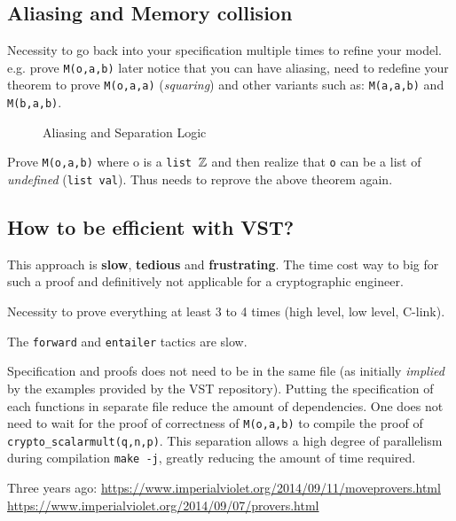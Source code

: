 \subsection{Aliasing and Memory collision}

Necessity to go back into your specification multiple times to refine your model.
e.g. prove \texttt{M(o,a,b)} later notice that you can have aliasing, need to redefine
your theorem to prove \texttt{M(o,a,a)} (\textit{squaring}) and other variants such as:
\texttt{M(a,a,b)} and \texttt{M(b,a,b)}.

\begin{figure}[h]
  
  \caption{Aliasing and Separation Logic}
  \label{tk:MemSame}
\end{figure}

Prove \texttt{M(o,a,b)} where o is a \texttt{list $\mathbb{Z}$} and then realize that
\texttt{o} can be a list of \textit{undefined} (\texttt{list val}). Thus needs
to reprove the above theorem again.

%   

\subsection{How to be efficient with VST?}

This approach is \textbf{slow}, \textbf{tedious} and \textbf{frustrating}.
The time cost way to big for such a proof and definitively not applicable for a
cryptographic engineer.

Necessity to prove everything at least 3 to 4 times (high level, low level, C-link).

The \texttt{forward} and \texttt{entailer} tactics are slow.

Specification and proofs does not need to be in the same file (as initially \textit{implied}
by the examples provided by the VST repository). Putting the specification of each
functions in separate file reduce the amount of dependencies. One does not need
to wait for the proof of correctness of \texttt{M(o,a,b)} to compile the proof of \texttt{crypto\_scalarmult(q,n,p)}.
This separation allows a high degree of parallelism during compilation \texttt{make -j},
greatly reducing the amount of time required.

Three years ago:
\url{https://www.imperialviolet.org/2014/09/11/moveprovers.html}
\url{https://www.imperialviolet.org/2014/09/07/provers.html}

